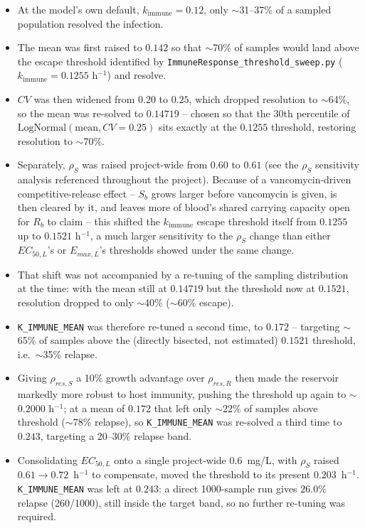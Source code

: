 \documentclass[11pt]{article}
\begin{document}
\begin{itemize}
\item At the model's own default, $k_{\mathrm{immune}} = 0.12$, only
$\sim$31--37\% of a sampled population resolved the infection.
\item The mean was first raised to $0.142$ so that $\sim$70\% of samples
would land above the escape threshold identified by
\texttt{ImmuneResponse\_threshold\_sweep.py}
($k_{\mathrm{immune}} = 0.1255$ h$^{-1}$) and resolve.
\item $CV$ was then widened from $0.20$ to $0.25$, which dropped resolution
to $\sim$64\%, so the mean was re-solved to $0.14719$ -- chosen so that the
30th percentile of $\mathrm{LogNormal}(\mathrm{mean}, CV{=}0.25)$ sits
exactly at the $0.1255$ threshold, restoring resolution to $\sim$70\%.
\item Separately, $\rho_S$ was raised project-wide from $0.60$ to $0.61$
(see the $\rho_S$ sensitivity analysis referenced throughout the project).
Because of a vancomycin-driven competitive-release effect -- $S_b$ grows
larger before vancomycin is given, is then cleared by it, and leaves more of
blood's shared carrying capacity open for $R_b$ to claim -- this shifted the
$k_{\mathrm{immune}}$ escape threshold itself from $0.1255$ up to
$0.1521$ h$^{-1}$, a much larger sensitivity to the $\rho_S$ change than
either $EC_{50,L}$'s or $E_{max,L}$'s thresholds showed under the same
change.
\item That shift was not accompanied by a re-tuning of the sampling
distribution at the time: with the mean still at $0.14719$ but the threshold
now at $0.1521$, resolution dropped to only $\sim$40\% ($\sim$60\% escape).
\item \texttt{K\_IMMUNE\_MEAN} was therefore re-tuned a second time, to
$0.172$ -- targeting $\sim$65\% of samples above the (directly bisected,
not estimated) $0.1521$ threshold, i.e.\ $\sim$35\% relapse.
\item Giving $\rho_{res,S}$ a 10\% growth advantage over $\rho_{res,R}$ then
made the reservoir markedly more robust to host immunity, pushing the
threshold up again to $\sim$$0.2000$ h$^{-1}$; at a mean of $0.172$ that
left only $\sim$22\% of samples above threshold ($\sim$78\% relapse), so
\texttt{K\_IMMUNE\_MEAN} was re-solved a third time to $0.243$, targeting a
20--30\% relapse band.
\item Consolidating $EC_{50,L}$ onto a single project-wide $0.6$~mg/L, with
$\rho_S$ raised $0.61 \to 0.72$~h$^{-1}$ to compensate, moved the threshold
to its present $0.203$~h$^{-1}$. \texttt{K\_IMMUNE\_MEAN} was left at
$0.243$: a direct 1000-sample run gives $26.0\%$ relapse (260/1000), still
inside the target band, so no further re-tuning was required.
\end{itemize}
\end{document}
